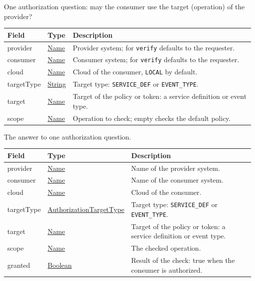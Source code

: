 \documentclass[a4paper]{arrowhead}
\newcommand{\pref}[1]{{\textcolor{ArrowheadGrey}{\hyperref[sec:model:primitives:#1]{#1}}}}
\begin{document}

One authorization question: may the consumer use the target (operation) of the provider?


\noindent\begin{tabularx}{\textwidth}{| >{\raggedright\arraybackslash}p{3.9cm} | >{\raggedright\arraybackslash\small}p{5.3cm} | X |} \hline
\rowcolor{gray!33} Field & Type & Description \\ \hline
provider & \pref{Name} & Provider system; for \texttt{verify} defaults to the requester. \\ \hline
consumer & \pref{Name} & Consumer system; for \texttt{verify} defaults to the requester. \\ \hline
cloud & \pref{Name} & Cloud of the consumer, \texttt{LOCAL} by default. \\ \hline
target\allowbreak{}Type & \pref{String} & Target type: \texttt{SERVICE\_\allowbreak{}DEF} or \texttt{EVENT\_\allowbreak{}TYPE}. \\ \hline
target & \pref{Name} & Target of the policy or token: a service definition or event type. \\ \hline
scope & \pref{Name} & Operation to check; empty checks the default policy. \\ \hline
\end{tabularx}




The answer to one authorization question.


\noindent\begin{tabularx}{\textwidth}{| >{\raggedright\arraybackslash}p{3.9cm} | >{\raggedright\arraybackslash\small}p{5.3cm} | X |} \hline
\rowcolor{gray!33} Field & Type & Description \\ \hline
provider & \pref{Name} & Name of the provider system. \\ \hline
consumer & \pref{Name} & Name of the consumer system. \\ \hline
cloud & \pref{Name} & Cloud of the consumer. \\ \hline
target\allowbreak{}Type & \pref{AuthorizationTargetType} & Target type: \texttt{SERVICE\_\allowbreak{}DEF} or \texttt{EVENT\_\allowbreak{}TYPE}. \\ \hline
target & \pref{Name} & Target of the policy or token: a service definition or event type. \\ \hline
scope & \pref{Name} & The checked operation. \\ \hline
granted & \pref{Boolean} & Result of the check: true when the consumer is authorized. \\ \hline
\end{tabularx}
\end{document}
